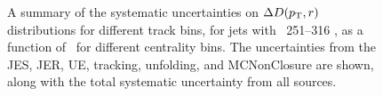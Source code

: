 \begin{figure}
{\begin{tabular}{cc}
\end{tabular} }
   \caption{A summary of the systematic uncertainties on $\Delta\mbox{$D( p_{\mathrm{T}}, r)$}$ distributions for different track \pt bins, for jets with \pt\ 251--316  \GeV, as a function of \rvar\ for different centrality bins. The uncertainties from the JES, JER, UE, tracking, unfolding, and MCNonClosure are shown, along with the total systematic uncertainty from all sources. }
      \label{fig:deltadptr_sys_uncert_A3}
\end{figure}

